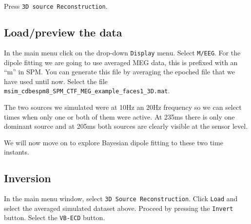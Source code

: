 Press  \texttt{3D source Reconstruction}.

\subsection{Load/preview the data}

In the main menu click on the drop-down \texttt{Display} menu. Select \texttt{M/EEG}. For the dipole fitting we are going to use averaged MEG data, this is prefixed with an ``m'' in SPM. You can generate this file by averaging the epoched file that we have used until now. Select the file \texttt{msim\_cdbespm8\_SPM\_CTF\_MEG\_example\_faces1\_3D.mat}.

The two sources we simulated were at 10Hz an 20Hz frequency so we can select times when only one or both of them were active.  At 235ms there is only one dominant source and at 205ms both sources are clearly visible at the sensor level.

We will now move on to explore Bayesian dipole fitting to these two time instants.

\subsection{Inversion}
In the main menu window, select \texttt{3D Source Reconstruction}. Click \texttt{Load} and select the averaged simulated dataset above.
Proceed by pressing the \texttt{Invert} button. Select the \texttt{VB-ECD} button.

